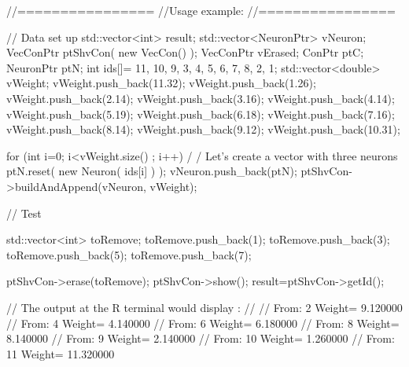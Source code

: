 \begin{DoxyCode}
        //================
        //Usage example:
        //================

        // Data set up
                        std::vector<int> result;
                        std::vector<NeuronPtr> vNeuron;
                        VecConPtr       ptShvCon( new VecCon() );
                        VecConPtr vErased;
                        ConPtr  ptC;
                        NeuronPtr ptN;
                        int ids[]= {11, 10, 9, 3, 4, 5, 6, 7, 8, 2, 1};
                        std::vector<double> vWeight;
                        vWeight.push_back(11.32);
                        vWeight.push_back(1.26);
                        vWeight.push_back(2.14);
                        vWeight.push_back(3.16);
                        vWeight.push_back(4.14);
                        vWeight.push_back(5.19);
                        vWeight.push_back(6.18);
                        vWeight.push_back(7.16);
                        vWeight.push_back(8.14);
                        vWeight.push_back(9.12);
                        vWeight.push_back(10.31);

                        for (int i=0; i<vWeight.size() ; i++) {                         /
      / Let's create a vector with three neurons
                                ptN.reset( new Neuron( ids[i] ) );
                                vNeuron.push_back(ptN);
                        }
                        ptShvCon->buildAndAppend(vNeuron, vWeight);

                        // Test

                        std::vector<int> toRemove;
                        toRemove.push_back(1);
                        toRemove.push_back(3);
                        toRemove.push_back(5);
                        toRemove.push_back(7);

                        ptShvCon->erase(toRemove);
                        ptShvCon->show();
                        result=ptShvCon->getId();

                // The output at the R terminal would display :
                //
                // From:         2       Weight=         9.120000
                // From:         4       Weight=         4.140000
                // From:         6       Weight=         6.180000
                // From:         8       Weight=         8.140000
                // From:         9       Weight=         2.140000
                // From:         10  Weight=     1.260000
                // From:         11  Weight=     11.320000
\end{DoxyCode}


